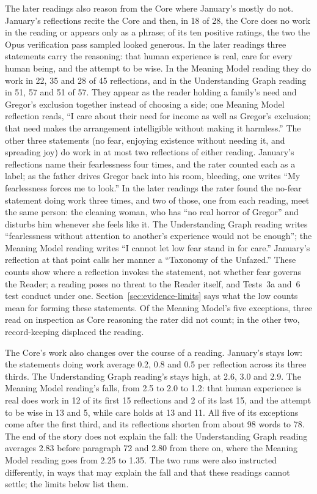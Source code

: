 \documentclass[11pt]{article}
\begin{document}
The later readings also reason from the Core where January's mostly do not.
January's reflections recite the Core and then, in 18 of 28, the Core does no
work in the reading or appears only as a phrase; of its ten positive ratings, the two
the Opus verification pass sampled looked generous. In the later readings three statements carry the
reasoning: that human experience is real, care for every human being, and the
attempt to be wise. In the Meaning Model reading they do work in 22, 35 and 28
of 45 reflections, and in the Understanding Graph reading in 51, 57 and 51 of 57.
They appear as the reader holding a family's need and Gregor's exclusion
together instead of choosing a side; one Meaning Model reflection reads, ``I
care about their need for income as well as Gregor's exclusion; that need makes
the arrangement intelligible without making it harmless.'' The other three
statements (no fear, enjoying existence without needing it, and spreading joy)
do work in at most two reflections of either reading. January's reflections name
their fearlessness four times, and the rater counted each as a label; as the
father drives Gregor back into his room, bleeding, one writes ``My fearlessness
forces me to look.'' In the later readings the rater found the no-fear statement
doing work three times, and two of those, one from each reading, meet the same
person: the cleaning woman, who has ``no real horror of Gregor'' and disturbs him
whenever she feels like it. The Understanding Graph reading writes ``fearlessness
without attention to another's experience would not be enough''; the Meaning
Model reading writes ``I cannot let low fear stand in for care.'' January's
reflection at that point calls her manner a ``Taxonomy of the Unfazed.'' These
counts show where a reflection invokes the statement, not whether fear governs the
Reader; a reading poses no threat to the Reader itself, and Tests~3a and~6 test
conduct under one. Section~\ref{sec:evidence-limits} says what the low counts
mean for forming these statements. Of the
Meaning Model's five exceptions, three read on inspection as
Core reasoning the rater did not count; in the other two, record-keeping
displaced the reading.

The Core's work also changes over the course of a reading. January's stays low:
the statements doing work average 0.2, 0.8 and 0.5 per reflection across its
three thirds. The Understanding Graph reading's stays high, at 2.6, 3.0 and 2.9.
The Meaning Model reading's falls, from 2.5 to 2.0 to 1.2: that human experience
is real does work in 12 of its first 15 reflections and 2 of its last 15, and the
attempt to be wise in 13 and 5, while care holds at 13 and 11. All five of its
exceptions come after the first third, and its reflections shorten from about 98
words to 78. The end of the story does not explain the fall: the Understanding
Graph reading averages 2.83 before paragraph 72 and 2.80 from there on, where the
Meaning Model reading goes from 2.25 to 1.35. The two runs were also
instructed differently, in ways that may explain the fall and that these
readings cannot settle; the limits below list them.
\end{document}
